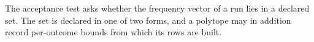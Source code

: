 
The acceptance test asks whether the frequency vector of a run lies in a
declared set. The set is declared in one of two forms, and a polytope may in
addition record per-outcome bounds from which its rows are built.

